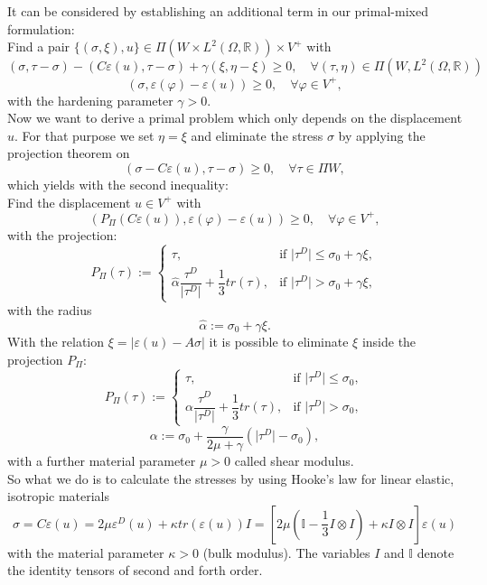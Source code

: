 \documentclass{article}
\begin{document}
It can be considered by establishing an additional term in our primal-mixed formulation:\\
Find a pair $\lbrace(\sigma,\xi),u\rbrace\in \Pi (W\times L^2(\Omega,\mathbb{R}))\times V^+$ with
$$\left(\sigma,\tau - \sigma\right) - \left(C\varepsilon(u), \tau - \sigma\right) + \gamma\left( \xi, \eta - \xi\right) \geq 0,\quad \forall (\tau,\eta)\in \Pi (W,L^2(\Omega,\mathbb{R}))$$
$$\left(\sigma,\varepsilon(\varphi) - \varepsilon(u)\right) \geq 0,\quad \forall \varphi\in V^+,$$
with the hardening parameter $\gamma > 0$.\\
Now we want to derive a primal problem which only depends on the displacement $u$. For that purpose we
set $\eta = \xi$ and eliminate the stress $\sigma$ by applying the projection theorem on\\
$$\left(\sigma - C\varepsilon(u), \tau - \sigma\right) \geq 0,\quad \forall \tau\in \Pi W,$$
which yields with the second inequality:\\
Find the displacement $u\in V^+$ with
$$\left(P_{\Pi}(C\varepsilon(u)),\varepsilon(\varphi) - \varepsilon(u)\right) \geq 0,\quad \forall \varphi\in V^+,$$
with the projection:
$$P_{\Pi}(\tau):=\begin{cases}
			\tau, & \text{if }\vert\tau^D\vert \leq \sigma_0 +  \gamma\xi,\\
			\hat\alpha\dfrac{\tau^D}{\vert\tau^D\vert} + \dfrac{1}{3}tr(\tau), & \text{if }\vert\tau^D\vert > \sigma_0 +  \gamma\xi,
			\end{cases}$$
with the radius
$$\hat\alpha := \sigma_0 + \gamma\xi .$$
With the relation $\xi = \vert\varepsilon(u) - A\sigma\vert$ it is possible to eliminate $\xi$ inside the projection $P_{\Pi}$:\\
$$P_{\Pi}(\tau):=\begin{cases}
			\tau, & \text{if }\vert\tau^D\vert \leq \sigma_0,\\
			\alpha\dfrac{\tau^D}{\vert\tau^D\vert} + \dfrac{1}{3}tr(\tau), & \text{if }\vert\tau^D\vert > \sigma_0,
			\end{cases}$$
$$\alpha := \sigma_0 + \dfrac{\gamma}{2\mu+\gamma}\left(\vert\tau^D\vert - \sigma_0\right) ,$$
with a further material parameter $\mu>0$ called shear modulus.\\
So what we do is to calculate the stresses by using Hooke's law for linear elastic,  isotropic materials
$$\sigma = C \varepsilon(u) = 2\mu \varepsilon^D(u) + \kappa tr(\varepsilon(u))I = \left[2\mu\left(\mathbb{I} -\dfrac{1}{3} I\otimes I\right) + \kappa I\otimes I\right]\varepsilon(u)$$
with the material parameter $\kappa>0$ (bulk modulus). The variables $I$ and $\mathbb{I}$ denote the identity tensors of second and forth order.\\
\end{document}
